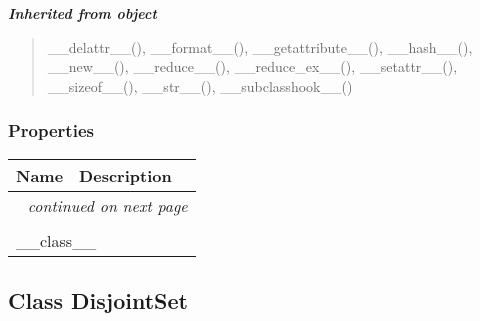 \large{\textbf{\textit{Inherited from object}}}

\begin{quote}
\_\_delattr\_\_(), \_\_format\_\_(), \_\_getattribute\_\_(), \_\_hash\_\_(), \_\_new\_\_(), \_\_reduce\_\_(), \_\_reduce\_ex\_\_(), \_\_setattr\_\_(), \_\_sizeof\_\_(), \_\_str\_\_(), \_\_subclasshook\_\_()
\end{quote}


  \subsubsection{Properties}

    \vspace{-1cm}
\hspace{\varindent}\begin{longtable}{|p{\varnamewidth}|p{\vardescrwidth}|l}
\cline{1-2}
\cline{1-2} \centering \textbf{Name} & \centering \textbf{Description}& \\
\cline{1-2}
\endhead\cline{1-2}\multicolumn{3}{r}{\small\textit{continued on next page}}\\\endfoot\cline{1-2}
\endlastfoot\multicolumn{2}{|l|}{\textit{Inherited from object}}\\
\multicolumn{2}{|p{\varwidth}|}{\raggedright \_\_class\_\_}\\
\cline{1-2}
\end{longtable}



\subsection{Class DisjointSet}

